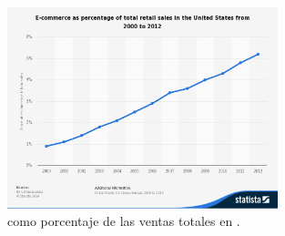 
\begin{figure}[h!]
	\centering
	\includegraphics[width=0.7\textwidth]{figuras/ecommerce_percent.jpg}
	\caption{\ecommerceCOM como porcentaje de las ventas totales en \usaNAME \cite{online_total_sales_2000_2012}.}
	\label{figure:ecommerce_percent_sales}
\end{figure}